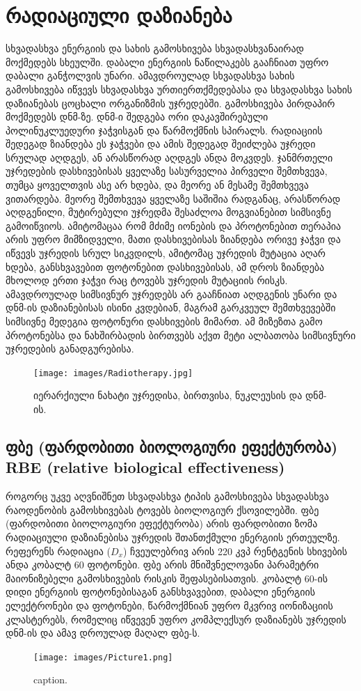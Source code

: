 \documentclass[12pt,a4paper,]{report}
\begin{document}
\chapter{რადიაციული დაზიანება}
სხვადასხვა ენერგიის და სახის გამოსხივება სხვადასხვანაირად მოქმედებს სხეულში. დაბალი ენერგიის ნაწილაკებს გააჩნიათ უფრო დაბალი განჭოლვის უნარი. ამავდროულად სხვადასხვა სახის გამოსხივება იწვევს სხვადასხვა ურთიერთქმედებასა და  სხვადასხვა სახის დაზიანებას ცოცხალი ორგანიზმის უჯრედებში. გამოსხივება პირდაპირ მოქმედებს დნმ-ზე. დნმ-ი შედგება ორი დაკავშირებული პოლინუკლუედური ჯაჭვისგან და წარმოქმნის სპირალს. რადიაციის შედეგად ზიანდება ეს ჯაჭვები და ამის შედეგად შეიძლება უჯრედი სრულად აღდგეს, ან არასწორად აღდგეს ანდა მოკვდეს. ჯანმრთელი უჯრედების დასხივებისას ყველაზე სასურველია პირველი შემთხვევა, თუმცა ყოველთვის ასე არ ხდება, და მეორე ან მესამე შემთხვევა ვითარდება. მეორე შემთხვევა ყველაზე საშიშია რადგანაც, არასწორად აღდგენილი, მუტირებული უჯრედმა შესაძლოა მოგვიანებით სიმსივნე გამოიწვიოს. ამიტომაცაა რომ მძიმე იონების და პროტონებით თერაპია არის უფრო მიმზიდველი, მათი დასხივებისას ზიანდება ორივე ჯაჭვი და იწვევს უჯრედის სრულ სიკვდილს, ამიტომაც უჯრედის მუტაცია აღარ ხდება, განსხვავებით ფოტონებით დასხივებისას, ამ დროს ზიანდება მხოლოდ ერთი ჯაჭვი რაც ტოვებს უჯრედის მუტაციის რისკს. ამავდროულად სიმსივნურ უჯრედებს არ გააჩნიათ აღდგენის უნარი და დნმ-ის დაზიანებისას ისინი კვდებიან, მაგრამ გარკვეულ შემთხვევებში სიმსივნე მედეგია ფოტონური დასხივების მიმართ. ამ მიზეზთა გამო პროტონებსა და ნახშირბადის ბირთვებს აქვთ მეტი ალბათობა სიმსივნური უჯრედების განადგურებისა.

	\begin{figure}[htp]
	    \centering
        \texttt{[image: images/Radiotherapy.jpg]}
        \caption{იერარქიული ნახატი უჯრედისა, ბირთვისა, ნუკლეუსის და დნმ-ის.}
        \label{fig:1}
    \end{figure}

\section{ფბე (ფარდობითი ბიოლოგიური ეფექტურობა) RBE (relative biological effectiveness)} 
როგორც უკვე აღვნიშნეთ სხვადასხვა ტიპის გამოსხივება სხვადასხვა რაოდენობის გამოსხივებას ტოვებს ბიოლოგიურ ქსოვილებში. ფბე (ფარდობითი ბიოლოგიური ეფექტურობა) არის ფარდობითი ზომა რადიაციული დაზიანებისა უჯრედის შთანთქმული ენერგიის ერთეულზე.
რეფერენს რადიაცია ($D_x$) ჩვეულებრივ არის 220 კვპ რენტგენის სხივების ანდა კობალტ 60 ფოტონები. ფბე არის მნიშვნელოვანი პარამეტრი მაიონიზებელი  გამოსხივების რისკის შეფასებისათვის. კობალტ 60-ის დიდი ენერგიის ფოტონებისაგან განსხვავებით, დაბალი ენერგიის ელექტრონები და ფოტონები, წარმოქმნიან უფრო მკვრივ იონიზაციის კლასტერებს, რომელიც იწვევენ უფრო კომპლექსურ დაზიანებს უჯრედის დნმ-ის და ამავ დროულად მაღალ ფბე-ს.
	\begin{figure}[htp]
	    \centering
        \texttt{[image: images/Picture1.png]}
        \caption{caption.}
        \label{fig:1}
    \end{figure}
\end{document}
